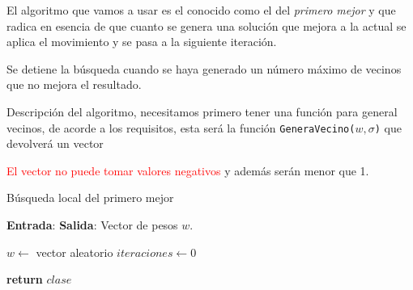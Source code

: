 El algoritmo que vamos a usar es el conocido como el del \textit{primero mejor} y que radica en esencia de que  cuanto se genera 
una solución que mejora a la actual se aplica el movimiento y se pasa a la siguiente iteración.

Se detiene la búsqueda cuando se haya generado un número máximo de vecinos que no mejora el resultado.

Descripción del algoritmo, necesitamos primero tener una función para general vecinos, de acorde a los requisitos, esta será 
la función \texttt{GeneraVecino($w,\sigma$)} que devolverá un vector 

\textcolor{red}{El vector no puede tomar valores negativos} y además serán menor que 1.
\begin{algorithm}
    \caption{Búsqueda local del primero mejor}
    \hspace*{\algorithmicindent} 
        \textbf{Entrada}:
        \hspace*{\algorithmicindent} 
        \textbf{Salida}:
        Vector de pesos $w$.        
    \begin{algorithmic}[1]
          \State $w \gets$ vector aleatorio  
          \State $iteraciones \gets 0$ 

        \EndWhile
        \State \textbf{return} $clase$
      \EndProcedure
    \end{algorithmic}
  \end{algorithm}



